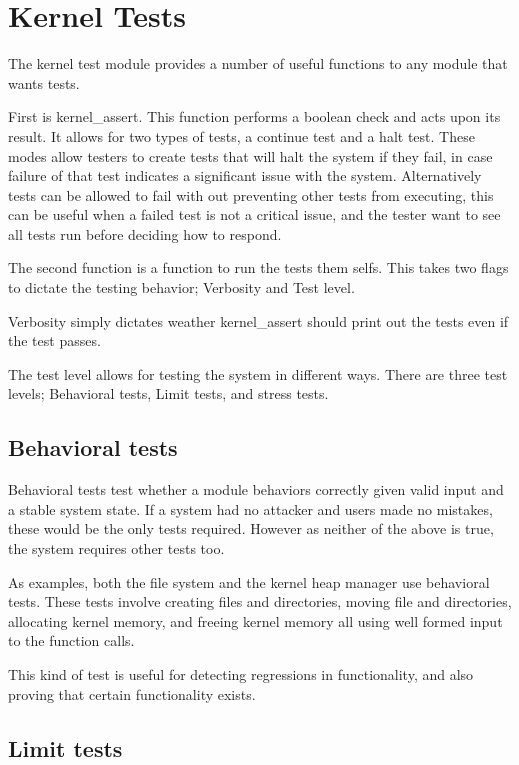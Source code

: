 \documentclass[a4paper]{report}
\begin{document}
\section{Kernel Tests}

The kernel test module provides a number of useful functions to any module that wants tests. 

First is kernel\_assert. This function performs a boolean check and acts upon its result. It allows for two types of tests, a continue test and a halt test. These modes allow testers to create tests that will halt the system if they fail, in case failure of that test indicates a significant issue with the system. Alternatively tests can be allowed to fail with out preventing other tests from executing, this can be useful when a failed test is not a critical issue, and the tester want to see all tests run before deciding how to respond.

The second function is a function to run the tests them selfs. This takes two flags to dictate the testing behavior; Verbosity and Test level.

Verbosity simply dictates weather kernel\_assert should print out the tests even if the test passes.

The test level allows for testing the system in different ways. There are three test levels; Behavioral tests, Limit tests, and stress tests.

\subsection{Behavioral tests}

Behavioral tests test whether a module behaviors correctly given valid input and a stable system state. If a system had no attacker and users made no mistakes, these would be the only tests required. However as neither of the above is true, the system requires other tests too.

As examples, both the file system and the kernel heap manager use behavioral tests. These tests involve creating files and directories, moving file and directories, allocating kernel memory, and freeing kernel memory all using well formed input to the function calls.

This kind of test is useful for detecting regressions in functionality, and also proving that certain functionality exists.

\subsection{Limit tests}
\end{document}
